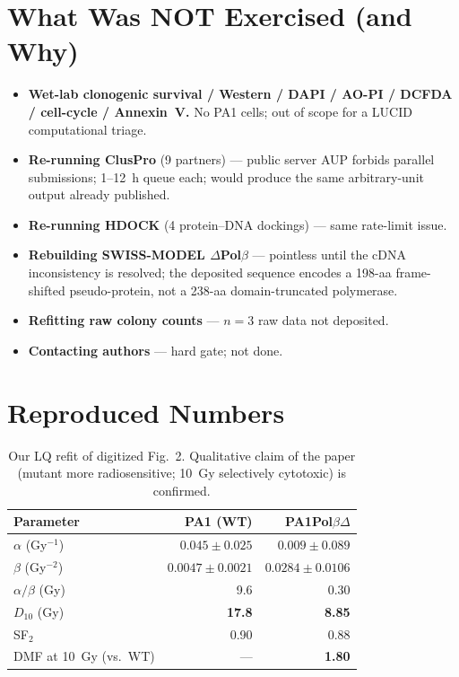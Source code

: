 \documentclass[11pt]{article}
\begin{document}
\section{What Was NOT Exercised (and Why)}
\begin{itemize}
  \item \textbf{Wet-lab clonogenic survival / Western / DAPI / AO-PI / DCFDA / cell-cycle / Annexin~V.} No PA1 cells; out of scope for a LUCID computational triage.
  \item \textbf{Re-running ClusPro} (9 partners) --- public server AUP forbids parallel submissions; 1--12~h queue each; would produce the same arbitrary-unit output already published.
  \item \textbf{Re-running HDOCK} (4 protein--DNA dockings) --- same rate-limit issue.
  \item \textbf{Rebuilding SWISS-MODEL $\Delta$Pol$\beta$} --- pointless until the cDNA inconsistency is resolved; the deposited sequence encodes a 198-aa frame-shifted pseudo-protein, not a 238-aa domain-truncated polymerase.
  \item \textbf{Refitting raw colony counts} --- $n=3$ raw data not deposited.
  \item \textbf{Contacting authors} --- hard gate; not done.
\end{itemize}

\section{Reproduced Numbers}
\begin{table}[h]
\centering
\small
\begin{tabular}{lrr}
\toprule
Parameter & PA1 (WT) & PA1Pol$\beta\Delta$ \\
\midrule
$\alpha$ (Gy$^{-1}$)  & $0.045 \pm 0.025$ & $0.009 \pm 0.089$ \\
$\beta$ (Gy$^{-2}$)   & $0.0047 \pm 0.0021$ & $0.0284 \pm 0.0106$ \\
$\alpha/\beta$ (Gy)   & 9.6 & 0.30 \\
$D_{10}$ (Gy)         & \textbf{17.8} & \textbf{8.85} \\
SF$_2$                & 0.90 & 0.88 \\
\midrule
DMF at 10~Gy (vs.\ WT) & --- & \textbf{1.80} \\
\bottomrule
\end{tabular}
\caption{Our LQ refit of digitized Fig.~2. Qualitative claim of the paper (mutant more radiosensitive; 10~Gy selectively cytotoxic) is confirmed.}
\end{table}
\end{document}
